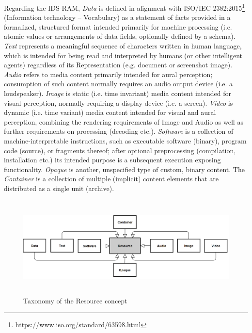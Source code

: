 Regarding the IDS-RAM, \textit{Data }is defined in alignment with ISO/IEC 2382:2015\footnote{ https://www.iso.org/standard/63598.html } (Information technology – Vocabulary)  as a statement of facts provided in a formalized, structured format intended primarily for machine processing (i.e. atomic values or arrangements of data fields, optionally defined by a schema). \textit{Text }represents a meaningful sequence of characters written in human language, which is intended for being read and interpreted by humans (or other intelligent agents) regardless of its Representation (e.g. document or screenshot image). \textit{Audio }refers to media content primarily intended for aural perception; consumption of such content normally requires an audio output device (i.e. a loudspeaker). \textit{Image }is static (i.e. time invariant) media content intended for visual perception, normally requiring a display device (i.e. a screen). \textit{Video }is dynamic (i.e. time variant) media content intended for visual and aural perception, combining the rendering requirements of Image and Audio as well as further requirements on processing (decoding etc.). \textit{Software} is a collection of machine-interpretable instructions, such as executable software (binary), program code (source), or fragments thereof; after optional preprocessing (compilation, installation etc.) its intended purpose is a subsequent execution exposing functionality. \textit{Opaque} is another, unspecified type of custom, binary content. The \textit{Container} is a collection of multiple (implicit) content elements that are distributed as a single unit (archive). 




\begin{figure}[H]
	\begin{Center}
		\includegraphics[width=6.53in,height=2.02in]{./media/image34.png}
		\caption{Taxonomy of the Resource concept}
		\label{fig:Taxonomy_of_the_Resource_concept}
	\end{Center}
\end{figure}


